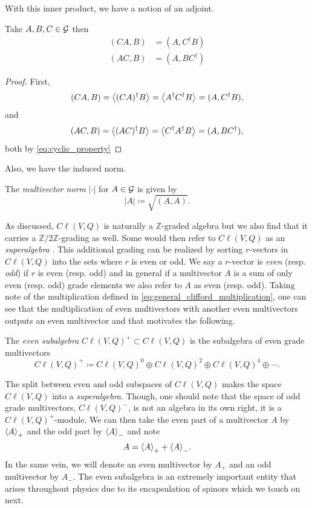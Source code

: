 With this inner product, we have a notion of an adjoint.
\begin{proposition}
\label{prop:adjoint}
Take $A,B,C \in \G$ then
\begin{align}
(CA,B) &= (A,C^\dagger B)\\
(AC,B) &= (A,BC^\dagger)
\end{align}
\end{proposition}
\begin{proof}
First,
\begin{align}
(CA,B) = \proj{}{(CA)^\dagger B} = \proj{}{ A^\dagger C^\dagger B } = (A,C^\dagger B),
\end{align}
and
\begin{align}
(AC,B) = \proj{}{(AC)^\dagger B} = \proj{}{ C^\dagger A^\dagger B } = (A,BC^\dagger),
\end{align}
both by \cref{eq:cyclic_property}
\end{proof}
Also, we have the induced norm.
\begin{definition}
    The \emph{multivector norm} $| \cdot |$ for $A \in \G$ is given by
    \begin{equation}
    |A| \coloneqq \sqrt{(A,A)}.
    \end{equation}
\end{definition}

As discussed, $C\ell(V,Q)$ is naturally a $\mathbb{Z}$-graded algebra but we also find that it carries a $\mathbb{Z}/2\mathbb{Z}$-grading as well. Some would then refer to $C\ell(V,Q)$ as an \emph{superalgebra} . This additional grading can be realized by sorting $r$-vectors in $C\ell(V,Q)$ into the sets where $r$ is even or odd.  We say a $r$-vector is \emph{even} (resp. \emph{odd}) if $r$ is even (resp. odd) and in general if a multivector $A$ is a sum of only even (resp. odd) grade elements we also refer to $A$ as even (resp. odd).  Taking note of the multiplication defined in \ref{eq:general_clifford_multiplication}, one can see that the multiplication of even multivectors with another even multivectors outputs an even multivector and that motivates the following.
\begin{definition}
The \emph{even subalgebra} $C\ell(V,Q)^+ \subset C\ell(V,Q)$ is the subalgebra of even grade multivectors
\begin{equation}
    C\ell(V,Q)^+ \coloneqq C\ell(V,Q)^0 \oplus C\ell(V,Q)^2 \oplus C\ell(V,Q)^4 \oplus \cdots.
\end{equation}
\end{definition}
The split between even and odd subspaces of $C\ell(V,Q)$ makes the space $C\ell(V,Q)$ into a \emph{superalgebra}. Though, one should note that the space of odd grade multivectors, $C\ell(V,Q)^-$, is not an algebra in its own right, it is a $C\ell(V,Q)^+$-module. We can then take the even part of a multivector $A$ by $\proj{+}{A}$ and the odd part by $\proj{-}{A}$ and note
\begin{equation}
A = \proj{+}{A} + \proj{-}{A}.
\end{equation}
In the same vein, we will denote an even multivector by $A_+$ and an odd multivector by $A_-$. The even subalgebra is an extremely important entity that arises throughout physics due to its encapsulation of spinors which we touch on next. 

